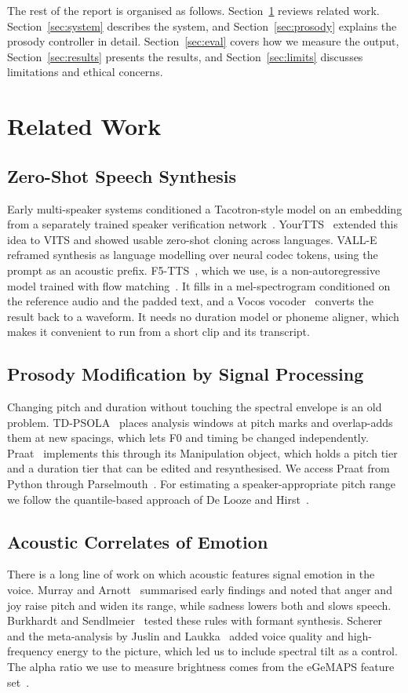 \documentclass[conference]{IEEEtran}
\begin{document}
The rest of the report is organised as follows. Section~\ref{sec:related} reviews related work.
Section~\ref{sec:system} describes the system, and Section~\ref{sec:prosody} explains the prosody
controller in detail. Section~\ref{sec:eval} covers how we measure the output, Section~\ref{sec:results}
presents the results, and Section~\ref{sec:limits} discusses limitations and ethical concerns.

\section{Related Work}\label{sec:related}

\subsection{Zero-Shot Speech Synthesis}
Early multi-speaker systems conditioned a Tacotron-style model on an embedding from a separately
trained speaker verification network~\cite{b4}. YourTTS~\cite{b2} extended this idea to VITS and
showed usable zero-shot cloning across languages. VALL-E~\cite{b1} reframed synthesis as language
modelling over neural codec tokens, using the prompt as an acoustic prefix. F5-TTS~\cite{b3}, which
we use, is a non-autoregressive model trained with flow matching~\cite{b5}. It fills in a
mel-spectrogram conditioned on the reference audio and the padded text, and a Vocos vocoder~\cite{b6}
converts the result back to a waveform. It needs no duration model or phoneme aligner, which makes it
convenient to run from a short clip and its transcript.

\subsection{Prosody Modification by Signal Processing}
Changing pitch and duration without touching the spectral envelope is an old problem. TD-PSOLA~\cite{b7}
places analysis windows at pitch marks and overlap-adds them at new spacings, which lets F0 and
timing be changed independently. Praat~\cite{b8} implements this through its Manipulation object,
which holds a pitch tier and a duration tier that can be edited and resynthesised. We access Praat
from Python through Parselmouth~\cite{b9}. For estimating a speaker-appropriate pitch range we
follow the quantile-based approach of De Looze and Hirst~\cite{b10}.

\subsection{Acoustic Correlates of Emotion}
There is a long line of work on which acoustic features signal emotion in the voice. Murray and
Arnott~\cite{b11} summarised early findings and noted that anger and joy raise pitch and widen its
range, while sadness lowers both and slows speech. Burkhardt and Sendlmeier~\cite{b12} tested
these rules with formant synthesis. Scherer~\cite{b13} and the meta-analysis by Juslin and Laukka~\cite{b14}
added voice quality and high-frequency energy to the picture, which led us to include spectral tilt
as a control. The alpha ratio we use to measure brightness comes from the eGeMAPS feature set~\cite{b15}.
\end{document}
